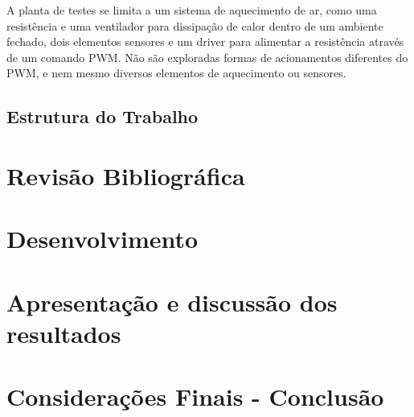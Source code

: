 \documentclass[12pt,a4paper]{report}
\begin{document}
A planta de testes se limita a um sistema de aquecimento de ar, como uma resistência e uma ventilador para dissipação de calor dentro de um ambiente fechado, dois elementos sensores e um driver para alimentar a resistência através de um comando PWM. Não são exploradas formas de acionamentos diferentes do PWM, e nem mesmo diversos elementos de aquecimento ou sensores.





\section{Estrutura do Trabalho}

\chapter{Revisão Bibliográfica}

\chapter{Desenvolvimento}

\chapter{Apresentação e discussão dos resultados}

\chapter{Considerações Finais - Conclusão}














\end{document}
